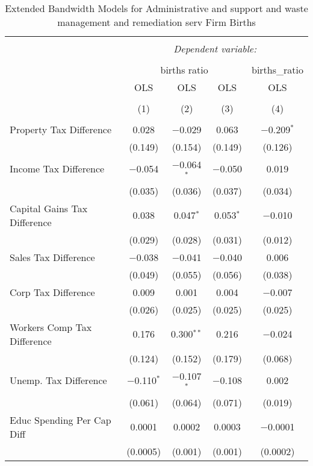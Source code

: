
\begin{table}[!htbp] \centering 
  \caption{Extended Bandwidth Models for  Administrative and support and waste management and remediation serv Firm Births} 
  \label{56eb} 
\begin{tabular}{@{\extracolsep{5pt}}lcccc} 
\\[-1.8ex]\hline 
\hline \\[-1.8ex] 
 & \multicolumn{4}{c}{\textit{Dependent variable:}} \\ 
\cline{2-5} 
\\[-1.8ex] & \multicolumn{3}{c}{births ratio} & births\_ratio \\ 
 & OLS & OLS & OLS & OLS \\ 
\\[-1.8ex] & (1) & (2) & (3) & (4)\\ 
\hline \\[-1.8ex] 
 Property Tax Difference & 0.028 & $-$0.029 & 0.063 & $-$0.209$^{*}$ \\ 
  & (0.149) & (0.154) & (0.149) & (0.126) \\ 
  Income Tax Difference & $-$0.054 & $-$0.064$^{*}$ & $-$0.050 & 0.019 \\ 
  & (0.035) & (0.036) & (0.037) & (0.034) \\ 
  Capital Gains Tax Difference & 0.038 & 0.047$^{*}$ & 0.053$^{*}$ & $-$0.010 \\ 
  & (0.029) & (0.028) & (0.031) & (0.012) \\ 
  Sales Tax Difference & $-$0.038 & $-$0.041 & $-$0.040 & 0.006 \\ 
  & (0.049) & (0.055) & (0.056) & (0.038) \\ 
  Corp Tax Difference & 0.009 & 0.001 & 0.004 & $-$0.007 \\ 
  & (0.026) & (0.025) & (0.025) & (0.025) \\ 
  Workers Comp Tax Difference & 0.176 & 0.300$^{**}$ & 0.216 & $-$0.024 \\ 
  & (0.124) & (0.152) & (0.179) & (0.068) \\ 
  Unemp. Tax Difference & $-$0.110$^{*}$ & $-$0.107$^{*}$ & $-$0.108 & 0.002 \\ 
  & (0.061) & (0.064) & (0.071) & (0.019) \\ 
  Educ Spending Per Cap Diff & 0.0001 & 0.0002 & 0.0003 & $-$0.0001 \\ 
  & (0.0005) & (0.001) & (0.001) & (0.0002) \\ 

\end{tabular}
\end{table}
